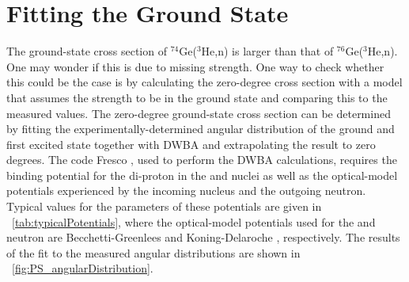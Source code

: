 \section{Fitting the \zp Ground State}
\label{sec:DWBA}

The ground-state cross section of $^{74}$Ge($^3$He,n) is larger than that of $^{76}$Ge($^3$He,n).  One may wonder if this is due to missing \zp strength.  One way to check whether this could be the case is by calculating the zero-degree cross section with a model that assumes the \zp strength to be in the ground state and comparing this to the measured values.  The zero-degree ground-state cross section can be determined by fitting the experimentally-determined angular distribution of the ground and first excited state together with DWBA and extrapolating the result to zero degrees.  The code Fresco \citep{Fresco}, used to perform the DWBA calculations, requires the binding potential for the di-proton in the  and  nuclei as well as the optical-model potentials experienced by the incoming  nucleus and the outgoing neutron.  Typical values for the parameters of these potentials are given in {\tab}~\ref{tab:typicalPotentials}, where the optical-model potentials used for the  and neutron are Becchetti-Greenlees \citep{Becchetti_3HePotential} and Koning-Delaroche \citep{Koning_neutronPotential}, respectively.  The results of the fit to the measured angular distributions are shown in {\fig}~\ref{fig:PS_angularDistribution}.
